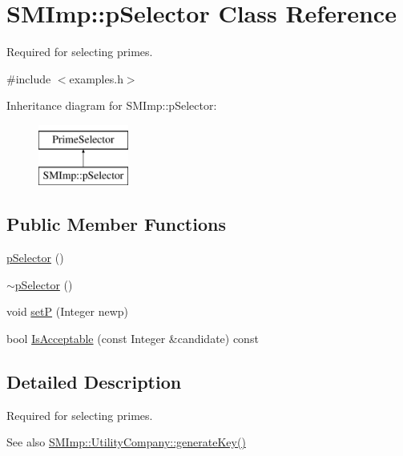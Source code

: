 \hypertarget{classSMImp_1_1pSelector}{}\section{S\+M\+Imp\+:\+:p\+Selector Class Reference}
\label{classSMImp_1_1pSelector}


Required for selecting primes.  




{\ttfamily \#include $<$examples.\+h$>$}

Inheritance diagram for S\+M\+Imp\+:\+:p\+Selector\+:\begin{figure}[H]
\begin{center}
\leavevmode
\includegraphics[height=2.000000cm]{classSMImp_1_1pSelector}
\end{center}
\end{figure}
\subsection*{Public Member Functions}
\begin{DoxyCompactItemize}
\item 
\hyperlink{classSMImp_1_1pSelector_a408417e2fa93448254ea6a36c5eb0f29}{p\+Selector} ()
\item 
\hyperlink{classSMImp_1_1pSelector_a73df279b8a33d0db836ace263e60f288}{$\sim$p\+Selector} ()
\item 
void \hyperlink{classSMImp_1_1pSelector_a095412eb63d8e76b6bb3e93cf139ead0}{setP} (Integer newp)
\item 
bool \hyperlink{classSMImp_1_1pSelector_a69d398cbd115e04490ce9fce5c8e2531}{Is\+Acceptable} (const Integer \&candidate) const
\end{DoxyCompactItemize}


\subsection{Detailed Description}
Required for selecting primes. 

\begin{DoxySeeAlso}{See also}
\hyperlink{classSMImp_1_1UtilityCompany_adeb454bff89a79e454d433bc1ccd448e}{S\+M\+Imp\+::\+Utility\+Company\+::generate\+Key()} 
\end{DoxySeeAlso}


